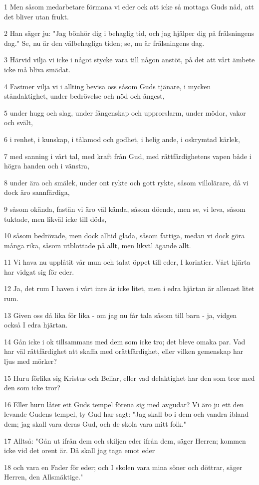 \par 1 Men såsom medarbetare förmana vi eder ock att icke så mottaga Guds nåd, att det bliver utan frukt.
\par 2 Han säger ju: "Jag bönhör dig i behaglig tid, och jag hjälper dig på frälsningens dag." Se, nu är den välbehagliga tiden; se, nu är frälsningens dag.
\par 3 Härvid vilja vi icke i något stycke vara till någon anstöt, på det att vårt ämbete icke må bliva smädat.
\par 4 Fastmer vilja vi i allting bevisa oss såsom Guds tjänare, i mycken ståndaktighet, under bedrövelse och nöd och ångest,
\par 5 under hugg och slag, under fångenskap och upprorslarm, under mödor, vakor och svält,
\par 6 i renhet, i kunskap, i tålamod och godhet, i helig ande, i oskrymtad kärlek,
\par 7 med sanning i vårt tal, med kraft från Gud, med rättfärdighetens vapen både i högra handen och i vänstra,
\par 8 under ära och smälek, under ont rykte och gott rykte, såsom villolärare, då vi dock äro sannfärdiga,
\par 9 såsom okända, fastän vi äro väl kända, såsom döende, men se, vi leva, såsom tuktade, men likväl icke till döds,
\par 10 såsom bedrövade, men dock alltid glada, såsom fattiga, medan vi dock göra många rika, såsom utblottade på allt, men likväl ägande allt.
\par 11 Vi hava nu upplåtit vår mun och talat öppet till eder, I korintier. Vårt hjärta har vidgat sig för eder.
\par 12 Ja, det rum I haven i vårt inre är icke litet, men i edra hjärtan är allenast litet rum.
\par 13 Given oss då lika för lika - om jag nu får tala såsom till barn - ja, vidgen också I edra hjärtan.
\par 14 Gån icke i ok tillsammans med dem som icke tro; det bleve omaka par. Vad har väl rättfärdighet att skaffa med orättfärdighet, eller vilken gemenskap har ljus med mörker?
\par 15 Huru förlika sig Kristus och Beliar, eller vad delaktighet har den som tror med den som icke tror?
\par 16 Eller huru låter ett Guds tempel förena sig med avgudar? Vi äro ju ett den levande Gudens tempel, ty Gud har sagt: "Jag skall bo i dem och vandra ibland dem; jag skall vara deras Gud, och de skola vara mitt folk."
\par 17 Alltså: "Gån ut ifrån dem och skiljen eder ifrån dem, säger Herren; kommen icke vid det orent är. Då skall jag taga emot eder
\par 18 och vara en Fader för eder; och I skolen vara mina söner och döttrar, säger Herren, den Allsmäktige."

